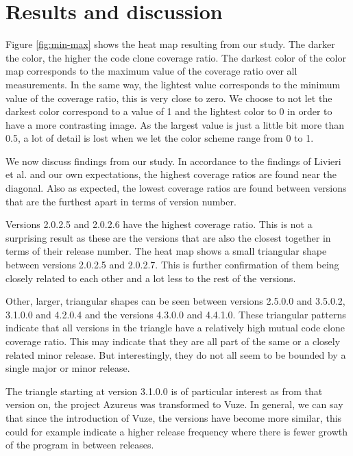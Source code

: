 \documentclass[a4paper,twoside, twocolumn, 11pt]{article}
\numberwithin{equation}{section}
\begin{document}
\section{Results and discussion}
Figure \ref{fig:min-max} shows the heat map resulting from our study. 
The darker the color, the higher the code clone coverage ratio. 
The darkest color of the color map corresponds to the maximum value of the coverage ratio over all measurements.
In the same way, the lightest value corresponds to the minimum value of the coverage ratio, this is very close to zero. 
We choose to not let the darkest color correspond to a value of 1 and the lightest color to 0 in order to have a more contrasting image.
As the largest value is just a little bit more than 0.5, a lot of detail is lost when we let the color scheme range from 0 to 1.

We now discuss findings from our study.
In accordance to the findings of Livieri et al. and our own expectations, the highest coverage ratios are found near the diagonal.
Also as expected, the lowest coverage ratios are found between versions that are the furthest apart in terms of version number.

Versions 2.0.2.5 and 2.0.2.6 have the highest coverage ratio.
This is not a surprising result as these are the versions that are also the closest together in terms of their release number. 
The heat map shows a small triangular shape between versions 2.0.2.5 and 2.0.2.7. 
This is further confirmation of them being closely related to each other and a lot less to the rest of the versions.

Other, larger, triangular shapes can be seen between versions 2.5.0.0 and 3.5.0.2, 3.1.0.0 and 4.2.0.4 and the versions 4.3.0.0 and 4.4.1.0.
These triangular patterns indicate that all versions in the triangle have a relatively high mutual code clone coverage ratio.
This may indicate that they are all part of the same or a closely related minor release.
But interestingly, they do not all seem to be bounded by a single major or minor release.

The triangle starting at version 3.1.0.0 is of particular interest as from that version on, the project Azureus was transformed to Vuze.
In general, we can say that since the introduction of Vuze, the versions have become more similar, this could for example indicate a higher release frequency where there is fewer growth of the program in between releases.

\end{document}
